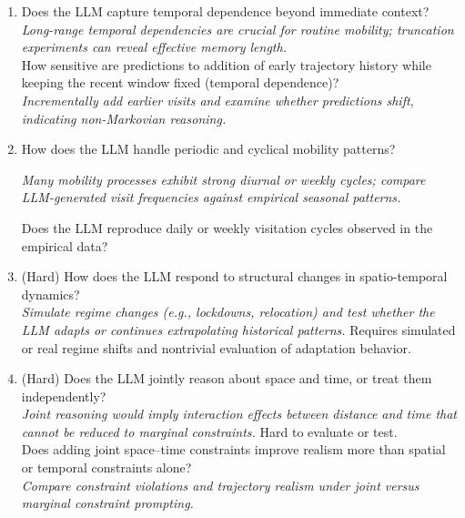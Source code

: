 \documentclass{article}
\begin{document}
\begin{enumerate}
    \begin{enumerate}
        \item When given semantically similar but spatially distant candidate POIs, does the LLM favor semantic coherence or geographic proximity?\\
        \textit{Construct controlled choice sets where semantic similarity and spatial distance are decoupled, and analyze systematic selection preferences.}
        \item Does explicitly providing distance or travel-time information in the prompt help improve prediction accuracy?
    \end{enumerate}



    \item Does the LLM capture temporal dependence beyond immediate context?\\
    \textit{Long-range temporal dependencies are crucial for routine mobility; truncation experiments can reveal effective memory length.}\\
    How sensitive are predictions to addition of early trajectory history while keeping the recent window fixed (temporal dependence)?\\
    \textit{Incrementally add earlier visits and examine whether predictions shift, indicating non-Markovian reasoning.}

    \item How does the LLM handle periodic and cyclical mobility patterns?
    
    \textit{Many mobility processes exhibit strong diurnal or weekly cycles; compare LLM-generated visit frequencies against empirical seasonal patterns.}
    
    Does the LLM reproduce daily or weekly visitation cycles observed in the empirical data?

    \item {\color{blue}(Hard)} How does the LLM respond to structural changes in spatio-temporal dynamics?\\
    \textit{Simulate regime changes (e.g., lockdowns, relocation) and test whether the LLM adapts or continues extrapolating historical patterns.}
    Requires simulated or real regime shifts and nontrivial evaluation of adaptation behavior.

    \item {\color{blue}(Hard)}  Does the LLM jointly reason about space and time, or treat them independently?\\
    \textit{Joint reasoning would imply interaction effects between distance and time that cannot be reduced to marginal constraints.} Hard to evaluate or test.\\
    Does adding joint space--time constraints improve realism more than spatial or temporal constraints alone?\\
    \textit{Compare constraint violations and trajectory realism under joint versus marginal constraint prompting.}
\end{enumerate}
\end{document}
